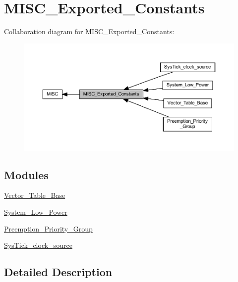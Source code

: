 \hypertarget{group___m_i_s_c___exported___constants}{}\section{M\+I\+S\+C\+\_\+\+Exported\+\_\+\+Constants}
\label{group___m_i_s_c___exported___constants}
Collaboration diagram for M\+I\+S\+C\+\_\+\+Exported\+\_\+\+Constants\+:
\nopagebreak
\begin{figure}[H]
\begin{center}
\leavevmode
\includegraphics[width=350pt]{group___m_i_s_c___exported___constants}
\end{center}
\end{figure}
\subsection*{Modules}
\begin{DoxyCompactItemize}
\item 
\hyperlink{group___vector___table___base}{Vector\+\_\+\+Table\+\_\+\+Base}
\item 
\hyperlink{group___system___low___power}{System\+\_\+\+Low\+\_\+\+Power}
\item 
\hyperlink{group___preemption___priority___group}{Preemption\+\_\+\+Priority\+\_\+\+Group}
\item 
\hyperlink{group___sys_tick__clock__source}{Sys\+Tick\+\_\+clock\+\_\+source}
\end{DoxyCompactItemize}


\subsection{Detailed Description}
